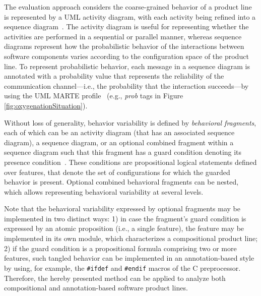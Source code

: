 The evaluation approach considers the coarse-grained behavior of a product line
is represented by a UML activity diagram, with each activity being refined into
a sequence diagram~\cite{rodrigues_modeling_2015}. The activity diagram is
useful for representing whether the activities are performed in a sequential or
parallel manner, whereas sequence diagrams represent how the probabilistic
behavior of the interactions between software components varies according to the
configuration space of the product line. To represent probabilistic behavior,
each message in a sequence diagram is annotated with a probability value that
represents the reliability of the communication channel---i.e., the probability that the
interaction succeeds---by using the UML MARTE profile~\cite{uml-marte-profile}
(e.g., \textit{prob} tags in Figure \ref{fig:oxygenationSituation}).


Without loss of generality, behavior variability is defined by
\textit{behavioral fragments}, each of which can be an activity diagram (that
has an associated sequence diagram),  a sequence diagram, or an optional
combined fragment within a sequence diagram such that this fragment has a  guard
condition denoting its presence condition~\cite{czarnecki_verifying_2006}.  These
conditions are propositional logical statements defined over features, that
denote the set of configurations for which the guarded behavior is present.
Optional combined behavioral fragments can be nested, which allows representing
behavioral variability at several levels.  


Note that the behavioral variability expressed by optional fragments may be
implemented in two distinct ways: 1)  in case the fragment's guard condition is
expressed by an atomic proposition (i.e., a single feature), the feature may be
implemented in its own module, which characterizes a compositional  product
line; 2) if the guard condition is a propositional formula comprising two or
more features, such tangled behavior can be implemented in an annotation-based
style by using, for example, the \texttt{\#ifdef} and \texttt{\#endif} macros of
the C preprocessor. Therefore, the hereby presented method can be applied to
analyze both compositional and annotation-based software product lines.


